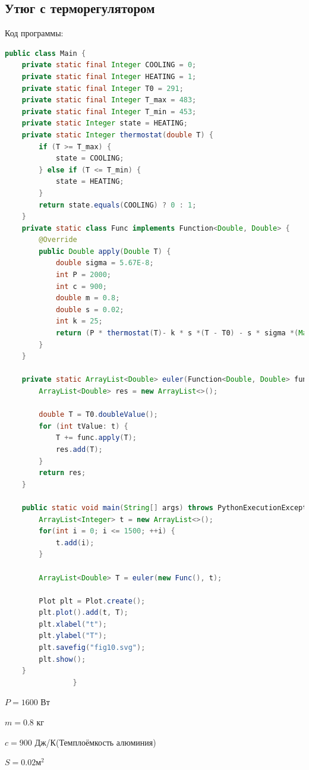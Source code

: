 \documentclass[a4paper, 14pt]{extarticle}
\begin{document}
		\subsection{Утюг с терморегулятором}
			Код программы:
			\begin{lstlisting}[language=Java]
public class Main {
	private static final Integer COOLING = 0;
	private static final Integer HEATING = 1;
	private static final Integer T0 = 291;
	private static final Integer T_max = 483;
	private static final Integer T_min = 453;
	private static Integer state = HEATING;
	private static Integer thermostat(double T) {
		if (T >= T_max) {
			state = COOLING;
		} else if (T <= T_min) {
			state = HEATING;
		}
		return state.equals(COOLING) ? 0 : 1;
	}
	private static class Func implements Function<Double, Double> {
		@Override
		public Double apply(Double T) {
			double sigma = 5.67E-8;
			int P = 2000;
			int c = 900;
			double m = 0.8;
			double s = 0.02;
			int k = 25;
			return (P * thermostat(T)- k * s *(T - T0) - s * sigma *(Math.pow(T, 4) - Math.pow(T0, 4))) / (c * m);
		}
	}
	
	private static ArrayList<Double> euler(Function<Double, Double> func, ArrayList<Integer> t) {
		ArrayList<Double> res = new ArrayList<>();
		
		double T = T0.doubleValue();
		for (int tValue: t) {
			T += func.apply(T);
			res.add(T);
		}
		return res;
	}
	
	public static void main(String[] args) throws PythonExecutionException, IOException {
		ArrayList<Integer> t = new ArrayList<>();
		for(int i = 0; i <= 1500; ++i) {
			t.add(i);
		}
		
		ArrayList<Double> T = euler(new Func(), t);
		
		Plot plt = Plot.create();
		plt.plot().add(t, T);
		plt.xlabel("t");
		plt.ylabel("T");
		plt.savefig("fig10.svg");
		plt.show();
	}
				}
			\end{lstlisting}
			\pagebreak
			$P = 1600$ Вт
			
			$m = 0.8$ кг
			
			$c = 900$ Дж/К(Темплоёмкость алюминия)
			
			$S = 0.02 \text{м}^2$
			
\end{document}

